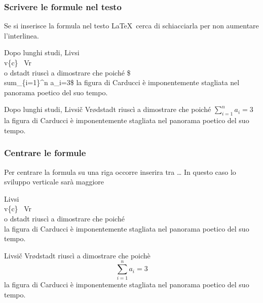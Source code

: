 \documentclass[svgnames,%
	ucs,%
	pdftex]{guitbeamer}
\begin{document}
\begin{frame}
  \frametitle{Scrivere le formule nel testo}
	Se si inserisce la formula nel testo \LaTeX\ cerca di schiacciarla per non aumentare l'interlinea.
	\begin{LaTeXcode}
		Dopo lunghi studi, Livsi\\v\{c\} \ Vr\\o dstadt riusc\`i a dimostrare che poich\'e \alert{\$\\sum\_\{i=1\}\textasciicircum n a\_i=3\$} la figura di Carducci \`e imponentemente stagliata nel panorama poetico del suo tempo.
	\end{LaTeXcode}
	\begin{LaTeXoutput}
		Dopo lunghi studi, Livsi\v{c} Vr\o dstadt riusc\`i a dimostrare che poich\'e $\sum_{i=1}^n a_i=3$ la figura di Carducci \`e imponentemente stagliata nel panorama poetico del suo tempo.
	\end{LaTeXoutput}
\end{frame}
\begin{frame}
  \frametitle{Centrare le formule}
	Per centrare la formula su una riga occorre inserira tra \LCmd[]{\\[}\dots\LCmd[]{\\]} In questo caso lo sviluppo verticale sar\`a maggiore
	\begin{LaTeXcode}
		Livsi\\v\{c\} \ Vr\\o dstadt riusc\`i a dimostrare che poich\'e
		\alert{\\[\\sum\_\{i=1\}\textasciicircum n a\_i\\]} la figura di Carducci \`e imponentemente stagliata nel panorama poetico del suo tempo. 
	\end{LaTeXcode}
	\begin{LaTeXoutput}
		Livsi\v{c} Vr\o dstadt riusc\`i a dimostrare che poich\`e
			\[\sum_{i=1}^n a_i=3\]
		la figura di Carducci \`e imponentemente stagliata nel panorama poetico del suo tempo. 
	\end{LaTeXoutput}
\end{frame}
\end{document}
